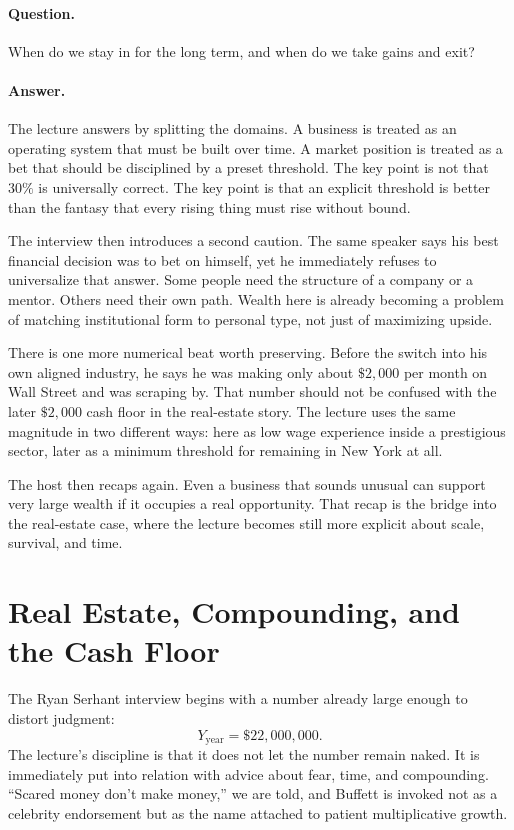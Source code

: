 \paragraph{Question.} When do we stay in for the long term, and when do we take gains and exit?

\paragraph{Answer.} The lecture answers by splitting the domains. A business is treated as an operating system that must be built over time. A market position is treated as a bet that should be disciplined by a preset threshold. The key point is not that \(30\%\) is universally correct. The key point is that an explicit threshold is better than the fantasy that every rising thing must rise without bound.

The interview then introduces a second caution. The same speaker says his best financial decision was to bet on himself, yet he immediately refuses to universalize that answer. Some people need the structure of a company or a mentor. Others need their own path. Wealth here is already becoming a problem of matching institutional form to personal type, not just of maximizing upside.

There is one more numerical beat worth preserving. Before the switch into his own aligned industry, he says he was making only about \(\$2{,}000\) per month on Wall Street and was scraping by. That number should not be confused with the later \(\$2{,}000\) cash floor in the real-estate story. The lecture uses the same magnitude in two different ways: here as low wage experience inside a prestigious sector, later as a minimum threshold for remaining in New York at all.

The host then recaps again. Even a business that sounds unusual can support very large wealth if it occupies a real opportunity. That recap is the bridge into the real-estate case, where the lecture becomes still more explicit about scale, survival, and time.

\section{Real Estate, Compounding, and the Cash Floor}

The Ryan Serhant interview begins with a number already large enough to distort judgment:
\begin{equation}
Y_{\text{year}} = \$22{,}000{,}000.
\end{equation}
The lecture's discipline is that it does not let the number remain naked. It is immediately put into relation with advice about fear, time, and compounding. ``Scared money don't make money,'' we are told, and Buffett is invoked not as a celebrity endorsement but as the name attached to patient multiplicative growth.

